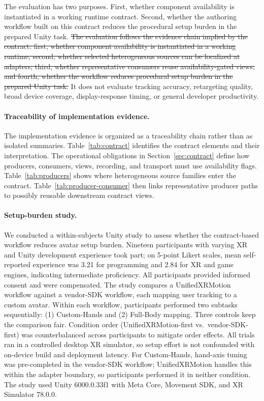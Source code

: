 \documentclass[runningheads]{llncs}
\newcommand{\radd}[1]{\textcolor{revadd}{#1}}
\newcommand{\rdel}[1]{\textcolor{revdel}{\sout{#1}}}
\newcommand{\radd}[1]{#1}
\newcommand{\rdel}[1]{}
\begin{document}
\radd{The evaluation has two purposes.
	First, whether component availability is instantiated in a working runtime contract.
	Second, whether the authoring workflow built on this contract reduces the procedural setup burden in the prepared Unity task.}
\rdel{The evaluation follows the evidence chain implied by the contract: first, whether component availability is instantiated in a working runtime; second, whether selected heterogeneous sources can be localized at adapters; third, whether representative consumers reuse availability-gated views; and fourth, whether the workflow reduces procedural setup burden in the prepared Unity task.}
It does not evaluate tracking accuracy, retargeting quality, broad device coverage, display-response timing, or general developer productivity.

\paragraph{Traceability of implementation evidence.}
	The implementation evidence is organized as a traceability chain rather than as isolated summaries.
	Table~\ref{tab:contract}  identifies the contract elements and their interpretation.
	The operational obligations in Section~\ref{sec:contract} define how producers, consumers, views, recording, and transport must use availability flags.
	Table~\ref{tab:producers} shows where heterogeneous source families enter the contract.
	Table~\ref{tab:producer-consumer} then links representative producer paths to possibly reusable downstream contract views.

\paragraph{Setup-burden study.}
\radd{
	We conducted a within-subjects Unity study to assess whether the contract-based workflow reduces avatar setup burden.
	Nineteen participants with varying XR and Unity development experience took part; on 5-point Likert scales, mean self-reported experience was 3.21 for programming and 2.84 for XR and game engines, indicating intermediate proficiency.
	All participants provided informed consent and were compensated.
	The study compares a UnifiedXRMotion workflow against a vendor-SDK workflow, each mapping user tracking to a custom avatar.
	Within each workflow, participants performed two subtasks sequentially: (1) Custom-Hands and (2) Full-Body mapping.
	Three controls keep the comparison fair.
	Condition order (UnifiedXRMotion-first vs.\ vendor-SDK-first) was counterbalanced across participants to mitigate order effects.
	All trials ran in a controlled desktop XR simulator, so setup effort is not confounded with on-device build and deployment latency.
	For Custom-Hands, hand-axis tuning was pre-completed in the vendor-SDK workflow; UnifiedXRMotion handles this within the adapter boundary, so participants performed it in neither condition.
	The study used Unity 6000.0.33f1 with Meta Core, Movement SDK, and XR Simulator 78.0.0.
}
\end{document}
